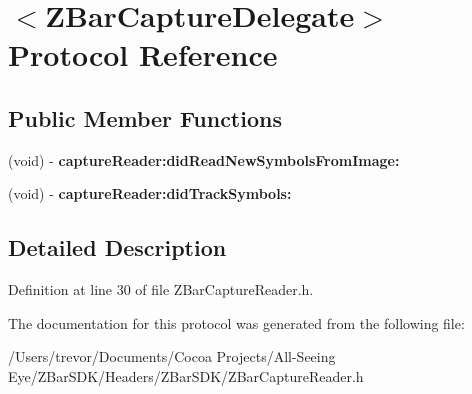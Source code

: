 \hypertarget{protocol_z_bar_capture_delegate-p}{
\section{$<$ZBarCaptureDelegate$>$ Protocol Reference}
\label{protocol_z_bar_capture_delegate-p}
}
\subsection*{Public Member Functions}
\begin{DoxyCompactItemize}
\item 
\hypertarget{protocol_z_bar_capture_delegate-p_a477fb4e602604c1acdea5ec39d16215c}{
(void) -\/ {\bfseries captureReader:didReadNewSymbolsFromImage:}}
\label{protocol_z_bar_capture_delegate-p_a477fb4e602604c1acdea5ec39d16215c}

\item 
\hypertarget{protocol_z_bar_capture_delegate-p_a880b2377e9bf9769fa4a80bf7ba545ac}{
(void) -\/ {\bfseries captureReader:didTrackSymbols:}}
\label{protocol_z_bar_capture_delegate-p_a880b2377e9bf9769fa4a80bf7ba545ac}

\end{DoxyCompactItemize}


\subsection{Detailed Description}


Definition at line 30 of file ZBarCaptureReader.h.



The documentation for this protocol was generated from the following file:\begin{DoxyCompactItemize}
\item 
/Users/trevor/Documents/Cocoa Projects/All-\/Seeing Eye/ZBarSDK/Headers/ZBarSDK/ZBarCaptureReader.h\end{DoxyCompactItemize}
